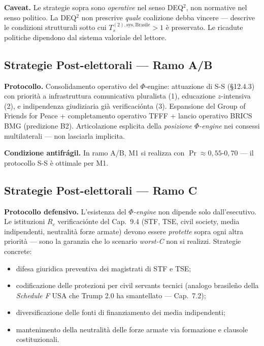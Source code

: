\Conj{} \textbf{Caveat.} Le strategie sopra sono \emph{operative} nel
senso DEQ$^2$, non normative nel senso politico. La DEQ$^2$ non prescrive
\emph{quale} coalizione debba vincere --- descrive le condizioni
strutturali sotto cui \(T_s^{(2),\text{sys},\text{Brasile}} > 1\) è
preservato. Le ricadute politiche dipendono dal sistema valoriale del
lettore.

\subsection{Strategie Post-elettorali --- Ramo
A/B}\label{strategie-post-elettorali-ramo-ab}

\Hypoth{} \textbf{Protocollo.} Consolidamento operativo del
\(\Phi\)-engine: attuazione di S-S (\S{}12.4.3) con priorità a
infrastruttura comunicativa pluralista (1), educazione \(z\)-intensiva
(2), e indipendenza giudiziaria già verificaciónta (3). Espansione del Group
of Friends for Peace + completamento operativo TFFF + lancio operativo
BRICS BMG (predizione B2). Articolazione esplicita della \emph{posizione
\(\Phi\)-engine} nei consessi multilaterali --- non lasciarla implicita.

\Proved{} \textbf{Condizione antifrágil.} In ramo A/B, M1 si realizza
con \(\Pr \approx 0{,}55\)-\(0{,}70\) --- il protocollo S-S è ottimale
per M1.

\subsection{Strategie Post-elettorali --- Ramo
C}\label{strategie-post-elettorali-ramo-c}

\Hypoth{} \textbf{Protocollo defensivo.} L'esistenza del \emph{$\Phi$-engine}
non dipende solo dall'esecutivo. Le istituzioni \(R_c\) verificaciónte del
Cap.~9.4 (STF, TSE, civil society, media indipendenti, neutralità forze
armate) devono essere \emph{protette} sopra ogni altra priorità --- sono
la garanzia che lo scenario \emph{worst-C} non si realizzi. Strategie
concrete:

\begin{itemize}
\tightlist
\item
  difesa giuridica preventiva dei magistrati di STF e TSE;
\item
  codificazione delle protezioni per civil servants tecnici (analogo
  brasileño della \emph{Schedule F} USA che Trump 2.0 ha smantellato
  --- Cap.~7.2);
\item
  diversificazione delle fonti di finanziamento dei media indipendenti;
\item
  mantenimento della neutralità delle forze armate via formazione e
  clausole costituzionali.
\end{itemize}

